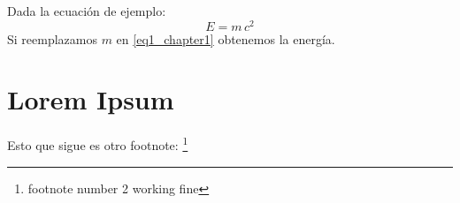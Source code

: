 Dada la ecuación de ejemplo:
\begin{equation}
	\label{eq1_chapter1}
	E=m\,c^2
\end{equation}
Si reemplazamos $m$ en \eqref{eq1_chapter1} obtenemos la energía.

\section{Lorem Ipsum}
\lipsum[1-15]
Esto que sigue es otro footnote: \footnote{footnote number 2 working fine}